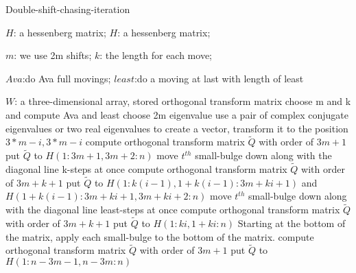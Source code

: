 \renewcommand{\algorithmicrequire}{\textbf{Input:}}
\renewcommand{\algorithmicensure}{\textbf{Output:}}
\begin{breakablealgorithm}
  \caption{Double-shift-chasing-iteration}
  \label{alg::Double-shift-chasing-iteration}
  \begin{algorithmic}[1]
    \Require $H$: a hessenberg matrix;
    \Ensure 
    $H$: a hessenberg matrix;

    $m$: we use 2m shifts;
    $k$: the length for each move;

    $Ava$:do Ava full movings;
    $least$:do a moving at last with length of least

    $W$: a three-dimensional array, stored orthogonal transform matrix
    \State choose m and k and compute Ava and least
    \State choose 2m eigenvalue
    \State use a pair of complex conjugate eigenvalues or two real eigenvalues to create a vector, transform it to the position \(3*m-i,3*m-i\)
    \State compute orthogonal transform matrix \({\widetilde Q}\) with order of \(3m+1\)
    \EndFor
    \State put \({\widetilde Q}\) to \(H(1:3m+1,3m+2:n)\)
    \State move \({{t^{th}}}\) small-bulge down along with the diagonal line k-steps at once
    \State compute orthogonal transform matrix \({\widetilde Q}\) with order of \(3m+k+1\)
    \EndFor
    \State put \({\widetilde Q}\) to \(H(1:k(i-1),1+k(i-1):3m+ki+1)\) and \(H(1+k(i-1):3m+ki+1,3m+ki+2:n)\)
    \EndFor
\State move \(t^{th}\) small-bulge down along with the diagonal line least-steps at once
    \State compute orthogonal transform matrix \({\widetilde Q}\) with order of \(3m+k+1\)
    \EndFor
    \State put \({\widetilde Q}\) to \(H(1:ki,1+ki:n)\)
    \State Starting at the bottom of the matrix, apply each small-bulge to the bottom of the matrix.
    \State compute orthogonal transform matrix \({\widetilde Q}\) with order of \(3m+1\)
    \EndFor
    \State put \({\widetilde Q}\) to \(H(1:n-3m-1,n-3m:n)\)
 \end{algorithmic}
\end{breakablealgorithm}